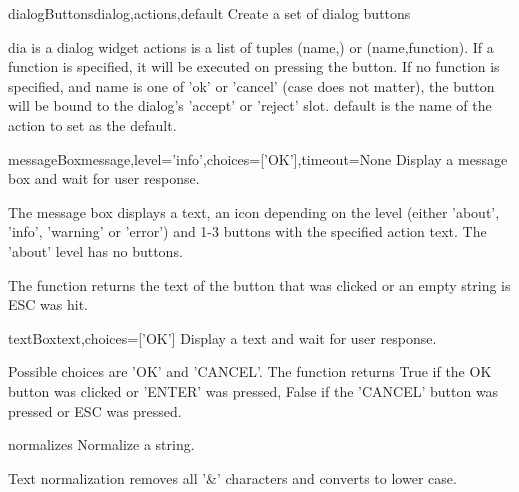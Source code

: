 \begin{funcdesc}{dialogButtons}{dialog,actions,default}
Create a set of dialog buttons

    dia is a dialog widget
    actions is a list of tuples (name,) or (name,function).
    If a function is specified, it will be executed on pressing the button.
    If no function is specified, and name is one of 'ok' or 'cancel' (case
    does not matter), the button will be bound to the dialog's 'accept'
    or 'reject' slot.
    default is the name of the action to set as the default.
    
\end{funcdesc}

\begin{funcdesc}{messageBox}{message,level='info',choices=['OK'],timeout=None}
Display a message box and wait for user response.

    The message box displays a text, an icon depending on the level
    (either 'about', 'info', 'warning' or 'error') and 1-3 buttons
    with the specified action text. The 'about' level has no buttons.

    The function returns the text of the button that was clicked or
    an empty string is ESC was hit.
    
\end{funcdesc}

\begin{funcdesc}{textBox}{text,choices=['OK']}
Display a text and wait for user response.

    Possible choices are 'OK' and 'CANCEL'.
    The function returns True if the OK button was clicked or 'ENTER'
    was pressed, False if the 'CANCEL' button was pressed or ESC was pressed.
    
\end{funcdesc}

\begin{funcdesc}{normalize}{s}
Normalize a string.

    Text normalization removes all '\&' characters and converts to lower case.
    
\end{funcdesc}


